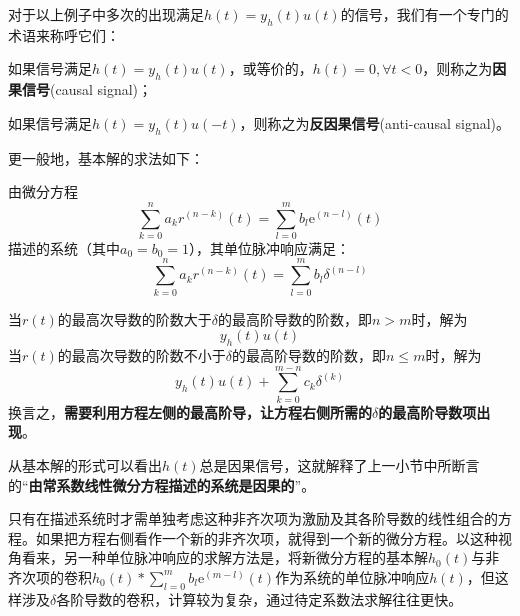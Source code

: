 \documentclass{ctexbook}
\begin{document}
对于以上例子中多次的出现满足$h(t)=y_h(t)u(t)$的信号，我们有一个专门的术语来称呼它们：

\begin{definition}
    如果信号满足$h(t)=y_h(t)u(t)$，或等价的，$h(t)=0,\forall t<0$，则称之为\textbf{因果信号}(causal signal)；
    
    如果信号满足$h(t)=y_h(t)u(-t)$，则称之为\textbf{反因果信号}(anti-causal signal)。
\end{definition}

更一般地，基本解的求法如下：
\begin{theorem}
    由微分方程
    \[\sum_{k=0}^{n}a_{k} r^{(n-k)}(t)=\sum_{l=0}^{m}b_{l} \mathrm{e}^{(n-l)}(t)\]
    描述的系统（其中$a_0=b_0=1$），其单位脉冲响应满足：
    \[\sum_{k=0}^{n}a_{k} r^{(n-k)}(t)=\sum_{l=0}^{m}b_{l} \delta^{(n-l)}\]
\end{theorem}
当$r(t)$的最高次导数的阶数大于$\delta$的最高阶导数的阶数，即$n>m$时，解为
$$y_h(t)u(t)$$
当$r(t)$的最高次导数的阶数不小于$\delta$的最高阶导数的阶数，即$n\leq m$时，解为
$$y_h(t)u(t)+\sum_{k=0}^{m-n}c_k \delta^{(k)}$$
换言之，\textbf{需要利用方程左侧的最高阶导，让方程右侧所需的$\delta$的最高阶导数项出现}。

从基本解的形式可以看出$h(t)$总是因果信号，这就解释了上一小节中所断言的“\textbf{由常系数线性微分方程描述的系统是因果的}”。

只有在描述系统时才需单独考虑这种非齐次项为激励及其各阶导数的线性组合的方程。如果把方程右侧看作一个新的非齐次项，就得到一个新的微分方程。以这种视角看来，另一种单位脉冲响应的求解方法是，将新微分方程的基本解$h_0(t)$与非齐次项的卷积$h_0(t)*\sum_{l=0}^{m}b_l \mathrm{e}^{(m-l)}(t)$作为系统的单位脉冲响应$h(t)$，但这样涉及$\delta$各阶导数的卷积，计算较为复杂，通过待定系数法求解往往更快。
\end{document}

